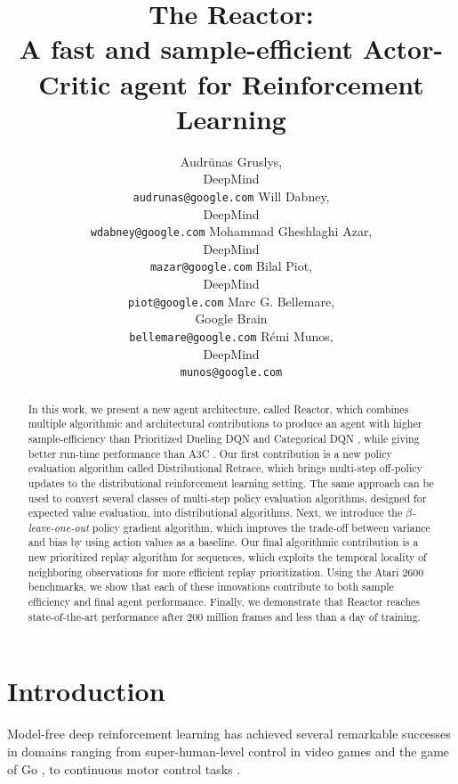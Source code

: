 \documentclass{article}
\title{The Reactor: \\ A fast and sample-efficient Actor-Critic agent for 
Reinforcement Learning}
\author{Audr{\=u}nas Gruslys, \\ DeepMind \\ \texttt{audrunas@google.com}
\And
Will Dabney, \\ DeepMind \\ \texttt{wdabney@google.com}
\And
Mohammad Gheshlaghi Azar, \\ DeepMind\\ \texttt{mazar@google.com}
\And
Bilal Piot, \\ DeepMind \\ \texttt{piot@google.com}
\And
Marc G. Bellemare, \\ Google Brain \\ \texttt{bellemare@google.com}
\And
R{\'e}mi Munos, \\ DeepMind \\ \texttt{munos@google.com}
}
\begin{document}
 

\maketitle

\begin{abstract}
In this work, we present a new agent architecture, called Reactor, which 
combines multiple algorithmic and architectural contributions to produce 
an agent with higher sample-efficiency than Prioritized Dueling DQN 
\citep{wang2017sample} and Categorical DQN \citep{bellemare2017distributional}, 
while giving better run-time performance than A3C \citep{mnih2016asynchronous}. 
Our first contribution is a new policy evaluation algorithm called Distributional 
Retrace, which brings multi-step off-policy updates to the 
distributional reinforcement learning setting. 
The same approach can be used to convert several classes of 
multi-step policy evaluation algorithms, designed for expected value evaluation, 
into distributional algorithms. Next, we introduce the {\em $\beta$-leave-one-out} 
policy gradient algorithm, which improves the trade-off between variance 
and bias by using action values as a baseline. Our final algorithmic contribution is 
a new prioritized replay algorithm for sequences, which exploits the temporal locality of 
neighboring observations for more efficient replay prioritization. 
Using the Atari 2600 benchmarks, we show that each of these innovations contribute to 
both sample efficiency and final agent performance. Finally, we demonstrate that Reactor 
reaches state-of-the-art performance after 200 million frames and less than a day of training.
\end{abstract} 

\section{Introduction}
\label{introduction}

Model-free deep reinforcement learning has achieved several remarkable 
successes in domains ranging from super-human-level control in video games 
\citep{mnih15human} and the game of Go \citep{silver2016mastering, agzero}, to 
continuous motor control tasks \citep{lillicrap2015continuous,schulman2015trust}.
\end{document}
